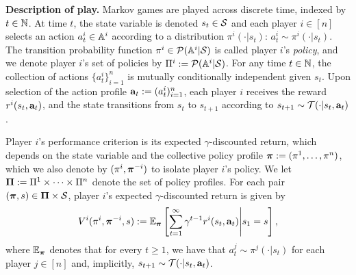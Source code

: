 \noindent \textbf{Description of play.} %
Markov games are played across discrete time, indexed by $t \in \nn$. At time $t$, the state variable is denoted $s_t \in \SS$ and each player $i \in [n]$ selects an action $a^i_t \in \aa^i$ according to a distribution $\pi^i ( \cdot | s_t)$: $a^i_t \sim \pi^i ( \cdot | s_t )$. The transition probability function $\pi^i \in \PP ( \aa^i | \SS )$ is called player $i$'s \emph{policy}, and we denote player $i$'s set of policies by $\Pi^i := \PP ( \aa^i | \SS )$. %
For any time $t \in \nn$, the collection of actions $\{ a^i_t \}_{i=1}^n$ is mutually conditionally independent given $s_t$. Upon selection of the action profile $\ba_t := (a^i_t )_{i=1}^n$, each player $i$ receives the reward $r^i ( s_t, \ba_t )$, and the state transitions from $s_t$ to $s_{t+1}$ according to $s_{t+1} \sim \TT ( \cdot | s_t, \ba_t)$.



Player $i$'s performance criterion is its expected $\gamma$-discounted return, which depends on the state variable and the collective policy profile $\bpi := ( \pi^1, \dots, \pi^n )$, which we also denote by $(\pi^i, \bpi^{-i})$ to isolate player $i$'s policy. We let $\bPi := \Pi^1 \times \cdots \times \Pi^n$ denote the set of policy profiles. For each pair $(\bpi, s) \in \bPi \times \SS$,   player $i$'s expected $\gamma$-discounted return is given by 
\[
V^i ( \pi^i, \bpi^{-i}, s ) := \ee_{\bpi } \left[ \sum_{t =1}^\infty \gamma^{t-1} r^i (s_t, \ba_t ) \middle| s_1 = s      \right],
\]
where $\ee_{\bpi}$ denotes that for every $t \geq 1$, we have that $a^j_t \sim \pi^j(\cdot | s_t )$ for each player $j \in [n]$ and, implicitly, $s_{t+1} \sim \TT ( \cdot | s_t,  \ba_t )$. 



